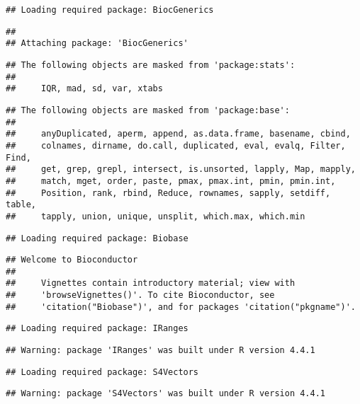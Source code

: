 \documentclass[
]{article}
\begin{document}
\begin{verbatim}
## Loading required package: BiocGenerics
\end{verbatim}

\begin{verbatim}
## 
## Attaching package: 'BiocGenerics'
\end{verbatim}

\begin{verbatim}
## The following objects are masked from 'package:stats':
## 
##     IQR, mad, sd, var, xtabs
\end{verbatim}

\begin{verbatim}
## The following objects are masked from 'package:base':
## 
##     anyDuplicated, aperm, append, as.data.frame, basename, cbind,
##     colnames, dirname, do.call, duplicated, eval, evalq, Filter, Find,
##     get, grep, grepl, intersect, is.unsorted, lapply, Map, mapply,
##     match, mget, order, paste, pmax, pmax.int, pmin, pmin.int,
##     Position, rank, rbind, Reduce, rownames, sapply, setdiff, table,
##     tapply, union, unique, unsplit, which.max, which.min
\end{verbatim}

\begin{verbatim}
## Loading required package: Biobase
\end{verbatim}

\begin{verbatim}
## Welcome to Bioconductor
## 
##     Vignettes contain introductory material; view with
##     'browseVignettes()'. To cite Bioconductor, see
##     'citation("Biobase")', and for packages 'citation("pkgname")'.
\end{verbatim}

\begin{verbatim}
## Loading required package: IRanges
\end{verbatim}

\begin{verbatim}
## Warning: package 'IRanges' was built under R version 4.4.1
\end{verbatim}

\begin{verbatim}
## Loading required package: S4Vectors
\end{verbatim}

\begin{verbatim}
## Warning: package 'S4Vectors' was built under R version 4.4.1
\end{verbatim}
\end{document}
